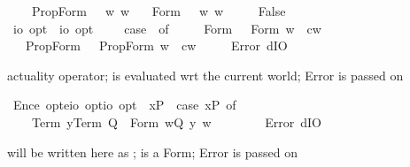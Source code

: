 \begin{isabellebody}
\ \ \ \ PropForm\ {\isasympsi}\ {\isasymRightarrow}\ {\isasymforall}w{\isachardot}{\isasymnot}{\isacharparenleft}{\isasympsi}\ w{\isacharparenright}\isanewline
\ \ {\isacharbar}\ Form\ {\isasympsi}\ {\isasymRightarrow}\ {\isasymforall}w{\isachardot}{\isasymnot}{\isacharparenleft}{\isasympsi}\ w{\isacharparenright}\isanewline
\ \ {\isacharbar}\ {\isacharunderscore}\ {\isasymRightarrow}\ False{\isachardoublequoteclose}%
\isamarkuptrue%
\isamarkupfalse%
\ {\isasymA}{\isacharcolon}{\isacharcolon}{\isachardoublequoteopen}io\ opt\ {\isasymRightarrow}\ io\ opt{\isachardoublequoteclose}\ \ {\isachardoublequoteopen}{\isasymA}\ {\isasymphi}\ {\isasymequiv}\ case\ {\isasymphi}\ of\ \isanewline
\ \ \ \ Form\ {\isasympsi}\ {\isasymRightarrow}\ Form\ {\isacharparenleft}{\isasymlambda}w{\isachardot}\ {\isasympsi}\ cw{\isacharparenright}\isanewline
\ \ {\isacharbar}\ PropForm\ {\isasympsi}\ {\isasymRightarrow}\ PropForm\ {\isacharparenleft}{\isasymlambda}w{\isachardot}\ {\isasympsi}\ cw{\isacharparenright}\isanewline
\ \ {\isacharbar}\ {\isacharunderscore}\ {\isasymRightarrow}\ Error\ dIO{\isachardoublequoteclose}%
\begin{isamarkuptext}%
actuality operator; \isa{{\isasymphi}} is evaluated wrt the current world; Error is passed on%
\end{isamarkuptext}%
\isamarkuptrue%
\isamarkupfalse%
\ Enc{\isacharcolon}{\isacharcolon}{\isachardoublequoteopen}e\ opt{\isasymRightarrow}{\isacharparenleft}e{\isasymRightarrow}io{\isacharparenright}\ opt{\isasymRightarrow}io\ opt{\isachardoublequoteclose}\ \ {\isachardoublequoteopen}{\isacharless}x{\isasymcirc}P{\isachargreater}\ {\isasymequiv}\ case\ {\isacharparenleft}x{\isacharcomma}P{\isacharparenright}\ of\ \isanewline
\ \ \ \ {\isacharparenleft}Term\ y{\isacharcomma}Term\ Q{\isacharparenright}\ {\isasymRightarrow}\ Form\ {\isacharparenleft}{\isasymlambda}w{\isachardot}{\isacharparenleft}Q\ y{\isacharparenright}\ w{\isacharparenright}\ \ \ \isanewline
\ \ {\isacharbar}\ {\isacharparenleft}{\isacharunderscore}{\isacharcomma}{\isacharunderscore}{\isacharparenright}\ {\isasymRightarrow}\ Error\ dIO{\isachardoublequoteclose}%
\begin{isamarkuptext}%
 will be written here as ;  is a Form; Error is passed on%

\end{isamarkuptext}
\end{isabellebody}
